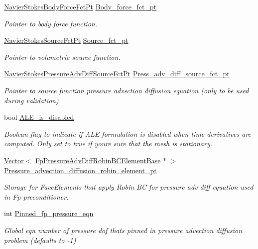 \begin{DoxyCompactItemize}
\hyperlink{classoomph_1_1NavierStokesEquations_a01443cdc37d9aa9d7644c79212108842}{Navier\+Stokes\+Body\+Force\+Fct\+Pt} \hyperlink{classoomph_1_1NavierStokesEquations_adf299ef64652fd7ee9491574feee8a38}{Body\+\_\+force\+\_\+fct\+\_\+pt}
\begin{DoxyCompactList}\small\item\em Pointer to body force function. \end{DoxyCompactList}\item 
\hyperlink{classoomph_1_1NavierStokesEquations_a1d69b671e6d4c0e75a02d6fa3dab478f}{Navier\+Stokes\+Source\+Fct\+Pt} \hyperlink{classoomph_1_1NavierStokesEquations_a1152c2258c3d19f3ee122be95c1785bd}{Source\+\_\+fct\+\_\+pt}
\begin{DoxyCompactList}\small\item\em Pointer to volumetric source function. \end{DoxyCompactList}\item 
\hyperlink{classoomph_1_1NavierStokesEquations_ae97e12328a88431038ccb321ee6d0c73}{Navier\+Stokes\+Pressure\+Adv\+Diff\+Source\+Fct\+Pt} \hyperlink{classoomph_1_1NavierStokesEquations_a4b50c799f9deafe43e5545deacfe9131}{Press\+\_\+adv\+\_\+diff\+\_\+source\+\_\+fct\+\_\+pt}
\begin{DoxyCompactList}\small\item\em Pointer to source function pressure advection diffusion equation (only to be used during validation) \end{DoxyCompactList}\item 
bool \hyperlink{classoomph_1_1NavierStokesEquations_aea9eb3444fda78c89f9ba0557f98525d}{A\+L\+E\+\_\+is\+\_\+disabled}
\begin{DoxyCompactList}\small\item\em Boolean flag to indicate if A\+LE formulation is disabled when time-\/derivatives are computed. Only set to true if you\textquotesingle{}re sure that the mesh is stationary. \end{DoxyCompactList}\item 
\hyperlink{classoomph_1_1Vector}{Vector}$<$ \hyperlink{classoomph_1_1FpPressureAdvDiffRobinBCElementBase}{Fp\+Pressure\+Adv\+Diff\+Robin\+B\+C\+Element\+Base} $\ast$ $>$ \hyperlink{classoomph_1_1NavierStokesEquations_af794c99b2e7b92201d7b811dda400052}{Pressure\+\_\+advection\+\_\+diffusion\+\_\+robin\+\_\+element\+\_\+pt}
\begin{DoxyCompactList}\small\item\em Storage for Face\+Elements that apply Robin BC for pressure adv diff equation used in Fp preconditioner. \end{DoxyCompactList}\item 
int \hyperlink{classoomph_1_1NavierStokesEquations_aa167732c56b63dd094fea694d73cc75d}{Pinned\+\_\+fp\+\_\+pressure\+\_\+eqn}
\begin{DoxyCompactList}\small\item\em Global eqn number of pressure dof that\textquotesingle{}s pinned in pressure advection diffusion problem (defaults to -\/1) \end{DoxyCompactList}\end{DoxyCompactItemize}
